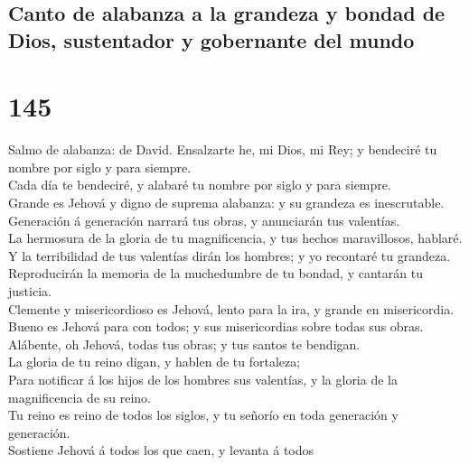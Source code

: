\hypertarget{canto-de-alabanza-a-la-grandeza-y-bondad-de-dios-sustentador-y-gobernante-del-mundo}{%
\subsection{Canto de alabanza a la grandeza y bondad de Dios,
sustentador y gobernante del
mundo}\label{canto-de-alabanza-a-la-grandeza-y-bondad-de-dios-sustentador-y-gobernante-del-mundo}}

\hypertarget{section-19-145}{%
\section{145}\label{section-19-145}}

 Salmo de alabanza: de David. Ensalzarte he, mi Dios, mi
Rey; y bendeciré tu nombre por siglo y para siempre.\\
 Cada día te bendeciré, y alabaré tu nombre por siglo y
para siempre.\\
 Grande es Jehová y digno de suprema alabanza: y su
grandeza es inescrutable.\\
 Generación á generación narrará tus obras, y anunciarán
tus valentías.\\
 La hermosura de la gloria de tu magnificencia, y tus
hechos maravillosos, hablaré.\\
 Y la terribilidad de tus valentías dirán los hombres; y
yo recontaré tu grandeza.\\
 Reproducirán la memoria de la muchedumbre de tu bondad, y
cantarán tu justicia.\\
 Clemente y misericordioso es Jehová, lento para la ira, y
grande en misericordia.\\
 Bueno es Jehová para con todos; y sus misericordias sobre
todas sus obras.\\
 Alábente, oh Jehová, todas tus obras; y tus santos te
bendigan.\\
 La gloria de tu reino digan, y hablen de tu fortaleza;\\
 Para notificar á los hijos de los hombres sus valentías,
y la gloria de la magnificencia de su reino.\\
 Tu reino es reino de todos los siglos, y tu señorío en
toda generación y generación.\\
 Sostiene Jehová á todos los que caen, y levanta á todos
